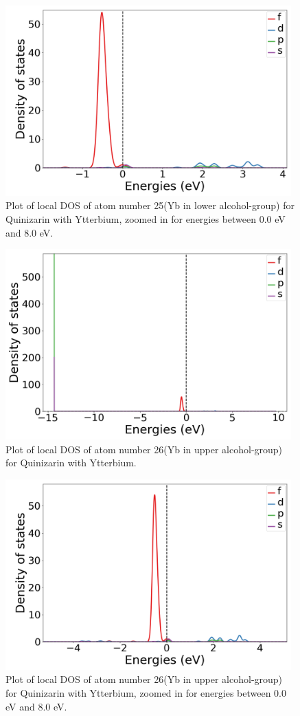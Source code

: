 \documentclass{article}
\begin{document}
  \begin{figure}[H]
      \centering
      \includegraphics[width = 11cm]{../fig/Yb_LDOS25_2.png}
      \caption{Plot of local DOS of atom number 25(Yb in lower alcohol-group) for Quinizarin with Ytterbium, zoomed in for energies between 0.0 eV and 8.0 eV. }
      \label{fig:Yb_LDOS25_2.png}
  \end{figure}

  \begin{figure}[H]
      \centering
      \includegraphics[width = 11cm]{../fig/Yb_LDOS26_1.png}
      \caption{Plot of local DOS of atom number 26(Yb in upper alcohol-group) for Quinizarin with Ytterbium. }
      \label{fig:Yb_LDOS26_1.png}
  \end{figure}

  \begin{figure}[H]
      \centering
      \includegraphics[width = 11cm]{../fig/Yb_LDOS26_2.png}
      \caption{Plot of local DOS of atom number 26(Yb in upper alcohol-group) for Quinizarin with Ytterbium, zoomed in for energies between 0.0 eV and 8.0 eV. }
      \label{fig:Yb_LDOS26_2.png}
  \end{figure}
\end{document}
